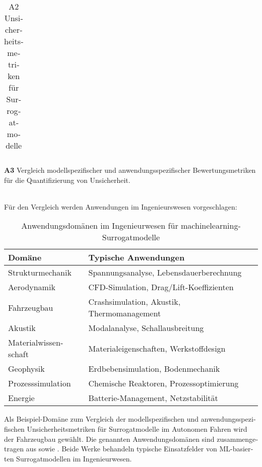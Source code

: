 \begin{otherlanguage}{ngerman}
\begin{table}[!htpb]
\begin{tabularx}{\textwidth}{|>{\centering\arraybackslash}l|X|X|}
{\begin{itemize}[topsep=0em, itemsep=0.4em, leftmargin=*, label={}]
        \parencite{sensoy2018evidential}
      \end{itemize}
    }
    \\ \hline

  \end{tabularx}
  \caption{A2 Unsicherheitsmetriken für Surrogatmodelle}
  \label{tab:chapter6r61}
\end{table}




\pagebreak


\textbf{A3} Vergleich modellspezifischer und anwendungsspezifischer Bewertungsmetriken für die Quantifizierung von Unsicherheit.
\par\noindent\\
Für den Vergleich werden Anwendungen im Ingenieurswesen vorgeschlagen: 

\begin{table}[!htbp]
\scriptsize
\begin{tabularx}{\textwidth}{|l|X|}
\hline
\textbf{Domäne} & \textbf{Typische Anwendungen} \\
\hline
Strukturmechanik & Spannungsanalyse, Lebensdauerberechnung \\
\hline
Aerodynamik & CFD-Simulation, Drag/Lift-Koeffizienten \\
\hline
Fahrzeugbau & Crashsimulation, Akustik, Thermomanagement \\
\hline
Akustik & Modalanalyse, Schallausbreitung \\
\hline
Materialwissenschaft & Materialeigenschaften, Werkstoffdesign \\
\hline
Geophysik & Erdbebensimulation, Bodenmechanik \\
\hline
Prozesssimulation & Chemische Reaktoren, Prozessoptimierung \\
\hline
Energie & Batterie-Management, Netzstabilität \\
\hline
\end{tabularx}
\caption{Anwendungsdomänen im Ingenieurwesen für \gls{machinelearning}-Surrogatmodelle}
\label{tab:ingenieurwesen-domains-small}
\end{table}

Als Beispiel-Domäne zum Vergleich der modellspezifischen und anwendungsspezifischen Unsicherheitsmetriken für Surrogatmodelle im Autonomen Fahren wird der Fahrzeugbau gewählt. Die genannten Anwendungsdomänen sind zusammengetragen aus \parencite{Gawlikowski2023} sowie \parencite{Ulmer2023}. Beide Werke behandeln typische Einsatzfelder von ML-basierten Surrogatmodellen im Ingenieurwesen.


\end{otherlanguage}
